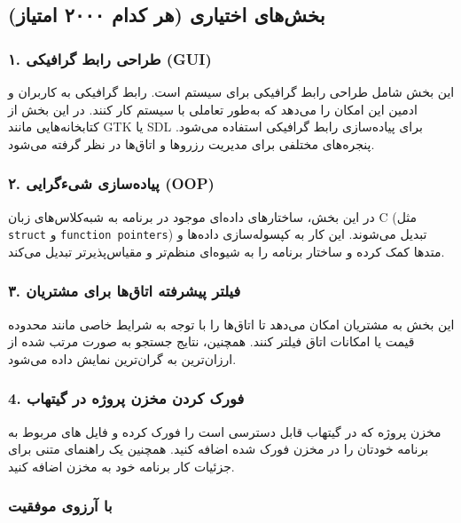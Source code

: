 \subsection*{بخش‌های اختیاری (هر کدام ۲۰۰۰ امتیاز)}
\subsubsection*{۱. طراحی رابط گرافیکی (GUI)}
این بخش شامل طراحی رابط گرافیکی برای سیستم است. رابط گرافیکی به کاربران و ادمین این امکان را می‌دهد که به‌طور تعاملی با سیستم کار کنند. در این بخش از کتابخانه‌هایی مانند GTK یا SDL برای پیاده‌سازی رابط گرافیکی استفاده می‌شود. پنجره‌های مختلفی برای مدیریت رزروها و اتاق‌ها در نظر گرفته می‌شود.

\subsubsection*{۲. پیاده‌سازی شیءگرایی (OOP)}
در این بخش، ساختارهای داده‌ای موجود در برنامه به شبه‌کلاس‌های زبان C (مثل \texttt{struct} و \texttt{function pointers}) تبدیل می‌شوند. این کار به کپسوله‌سازی داده‌ها و متدها کمک کرده و ساختار برنامه را به شیوه‌ای منظم‌تر و مقیاس‌پذیرتر تبدیل می‌کند.

\subsubsection*{۳. فیلتر پیشرفته اتاق‌ها برای مشتریان}
این بخش به مشتریان امکان می‌دهد تا اتاق‌ها را با توجه به شرایط خاصی مانند محدوده قیمت یا امکانات اتاق فیلتر کنند. همچنین، نتایج جستجو به صورت مرتب شده از ارزان‌ترین به گران‌ترین نمایش داده می‌شود.

\subsubsection*{4. فورک کردن مخزن پروژه در گیتهاب }
مخزن پروژه که در گیتهاب قابل دسترسی است را فورک کرده و فایل های مربوط به برنامه خودتان را در مخزن فورک شده اضافه کنید. همچنین یک راهنمای متنی برای جزئیات کار برنامه خود به مخزن اضافه کنید.

\vspace{4cm}

\subsubsection*{با آرزوی موفقیت}



